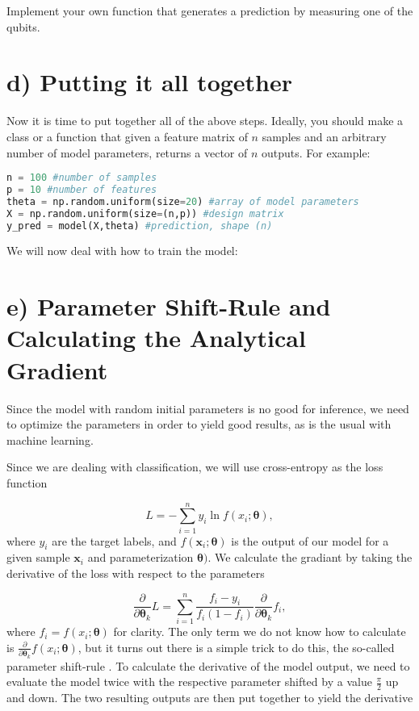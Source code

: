 \documentclass[letterpaper,11pt]{article}
\begin{document}
Implement your own function that generates a prediction by measuring one of the qubits.

\section*{d) Putting it all together}
Now it is time to put together all of the above steps. Ideally, you should make a class or a function that given a feature matrix of $n$ samples and an arbitrary number of model parameters, returns a vector of $n$ outputs. For example:
\begin{lstlisting}[language=Python]
n = 100 #number of samples
p = 10 #number of features
theta = np.random.uniform(size=20) #array of model parameters
X = np.random.uniform(size=(n,p)) #design matrix
y_pred = model(X,theta) #prediction, shape (n)
\end{lstlisting}

\bigskip

We will now deal with how to train the model:

\section*{e) Parameter Shift-Rule and Calculating the Analytical Gradient}
Since the model with random initial parameters is no good for inference, we need to optimize the parameters in order to yield good results, as is the usual with machine learning. 

Since we are dealing with classification, we will use cross-entropy as the loss function

\begin{equation*}
    L = -\sum_{i=1}^{n}{y_i \ln{f(x_i;\boldsymbol{\theta})}},
\end{equation*}
where $y_i$ are the target labels, and $f(\boldsymbol{x}_i;\boldsymbol{\theta})$ is the output of our model for a given sample $\boldsymbol{x}_i$ and parameterization $\boldsymbol{\theta})$. We calculate the gradiant by taking the derivative of the loss with respect to the parameters

\begin{equation*}
    \frac{\partial}{\partial \boldsymbol{\theta}_k}L = \sum_{i=1}^{n}{\frac{f_i - y_i}{f_i(1 - f_i)}} \frac{\partial}{\partial \boldsymbol{\theta}_k}f_i,
\end{equation*}
where $f_i = f(x_i;\boldsymbol{\theta})$ for clarity. The only term we do not know how to calculate is $\frac{\partial}{\partial \boldsymbol{\theta}_k}f(x_i;\boldsymbol{\theta})$, but it turns out there is a simple trick to do this, the so-called parameter shift-rule \cite{ParameterShift}. To calculate the derivative of the model output, we need to evaluate the model twice with the respective parameter shifted by a value $\frac{\pi}{2}$ up and down. The two resulting outputs are then put together to yield the derivative
\end{document}
